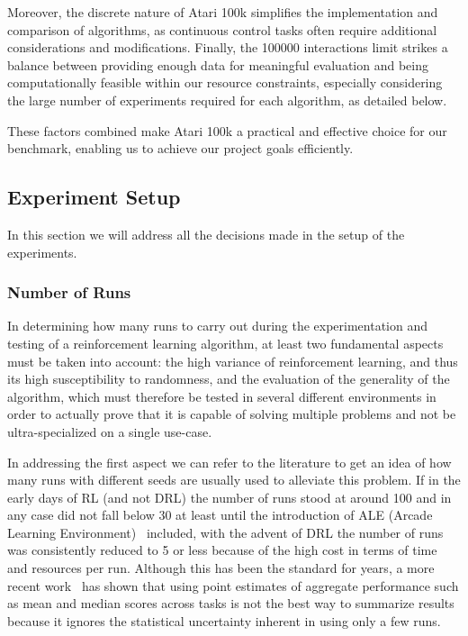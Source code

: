 Moreover, the discrete nature of Atari 100k simplifies the implementation and comparison of algorithms, as continuous control tasks often require additional considerations and modifications. Finally, the \num{100000} interactions limit strikes a balance between providing enough data for meaningful evaluation and being computationally feasible within our resource constraints, especially considering the large number of experiments required for each algorithm, as detailed below.

These factors combined make Atari 100k a practical and effective choice for our benchmark, enabling us to achieve our project goals efficiently.


\subsection{Experiment Setup}
\label{subsec:experiment_setup}
In this section we will address all the decisions made in the setup of the experiments.

\subsubsection{Number of Runs}
\label{subsubsec:number_runs}

In determining how many runs to carry out during the experimentation and testing of a reinforcement learning algorithm, at least two fundamental aspects must be taken into account: the high variance of reinforcement learning, and thus its high susceptibility to randomness, and the evaluation of the generality of the algorithm, which must therefore be tested in several different environments in order to actually prove that it is capable of solving multiple problems and not be ultra-specialized on a single use-case.

In addressing the first aspect we can refer to the literature to get an idea of how many runs with different seeds are usually used to alleviate this problem. If in the early days of RL (and not DRL) the number of runs stood at around 100 and in any case did not fall below 30 at least until the introduction of ALE (Arcade Learning Environment)~\cite{bellemare:ale} included, with the advent of DRL the number of runs was consistently reduced to 5 or less because of the high cost in terms of time and resources per run. Although this has been the standard for years, a more recent work~\cite{agarwal:statistical_precipice} has shown that using point estimates of aggregate performance such as mean and median scores across tasks is not the best way to summarize results because it ignores the statistical uncertainty inherent in using only a few runs.

